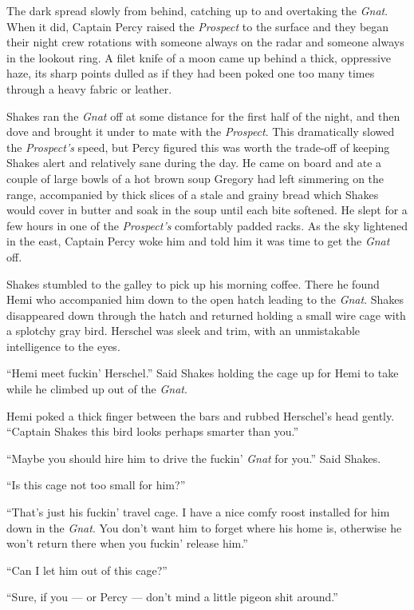 \documentclass[
]{scrbook}
\begin{document}
The dark spread slowly from behind, catching up to and overtaking the
\emph{Gnat}. When it did, Captain Percy raised the \emph{Prospect} to
the surface and they began their night crew rotations with someone
always on the radar and someone always in the lookout ring. A filet
knife of a moon came up behind a thick, oppressive haze, its sharp
points dulled as if they had been poked one too many times through a
heavy fabric or leather.

Shakes ran the \emph{Gnat} off at some distance for the first half of
the night, and then dove and brought it under to mate with the
\emph{Prospect}. This dramatically slowed the \emph{Prospect's} speed,
but Percy figured this was worth the trade-off of keeping Shakes alert
and relatively sane during the day. He came on board and ate a couple of
large bowls of a hot brown soup Gregory had left simmering on the range,
accompanied by thick slices of a stale and grainy bread which Shakes
would cover in butter and soak in the soup until each bite softened. He
slept for a few hours in one of the \emph{Prospect's} comfortably padded
racks. As the sky lightened in the east, Captain Percy woke him and told
him it was time to get the \emph{Gnat} off.

Shakes stumbled to the galley to pick up his morning coffee. There he
found Hemi who accompanied him down to the open hatch leading to the
\emph{Gnat}. Shakes disappeared down through the hatch and returned
holding a small wire cage with a splotchy gray bird. Herschel was sleek
and trim, with an unmistakable intelligence to the eyes.

``Hemi meet fuckin' Herschel.'' Said Shakes holding the cage up for Hemi
to take while he climbed up out of the \emph{Gnat}.

Hemi poked a thick finger between the bars and rubbed Herschel's head
gently. ``Captain Shakes this bird looks perhaps smarter than you.''

``Maybe you should hire him to drive the fuckin' \emph{Gnat} for you.''
Said Shakes.

``Is this cage not too small for him?''

``That's just his fuckin' travel cage. I have a nice comfy roost
installed for him down in the \emph{Gnat}. You don't want him to forget
where his home is, otherwise he won't return there when you fuckin'
release him.''

``Can I let him out of this cage?''

``Sure, if you --- or Percy --- don't mind a little pigeon shit
around.''
\end{document}
